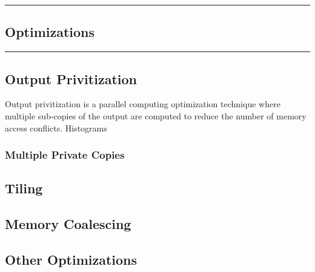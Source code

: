 {\color{gray}\hrule}
\begin{center}
	\section{Optimizations}
	\bigskip
\end{center}
{\color{gray}\hrule}
\begin{multicols}{2}
	\subsection{Output Privitization}
	Output privitization is a parallel computing optimization technique where multiple sub-copies of the output are computed to reduce the number of memory access conflicts. Histograms
	\subsubsection{Multiple Private Copies}
	\subsection{Tiling}
	\subsection{Memory Coalescing}
	
	\subsection{Other Optimizations}
\end{multicols}